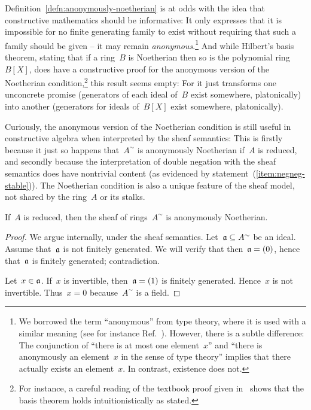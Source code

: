 \documentclass{ws-rv9x6}
\begin{document}
{Definition~\ref{defn:anonymously-noetherian} is at odds with the idea that constructive mathematics should
be informative: It only expresses that it is impossible for no finite
generating family to exist without requiring that such a family should be given
-- it may remain \emph{anonymous}.\footnote{We borrowed the term ``anonymous''
from type theory, where it is used with a similar meaning (see for instance
Ref.~). However, there is a
subtle difference: The conjunction of ``there is at most one element~$x$'' and
``there is anonymously an element~$x$ in the sense of type theory'' implies
that there actually exists an element~$x$. In contrast, \notnot existence does
not.} And while Hilbert's basis theorem, stating that if a ring~$B$ is
Noetherian then so is the polynomial ring~$B[X]$, does have a constructive
proof for the anonymous version of the Noetherian condition,\footnote{For
instance, a careful reading of the textbook proof given
in~\cite[Theorem~7.5]{atiyah-macdonald:commutative-algebra} shows that the
basis theorem holds intuitionistically as stated.} this result seems empty: For
it just transforms one unconcrete promise (generators of each ideal of~$B$
exist somewhere, platonically) into another (generators for ideals of~$B[X]$
exist somewhere, platonically).

Curiously, the anonymous version of the Noetherian condition is still useful in
constructive algebra when interpreted by the sheaf semantics: This is firstly
because it just so happens that~$A^\sim$ is anonymously Noetherian if~$A$ is reduced,
and secondly because the interpretation of double negation with the sheaf
semantics does have nontrivial content (as evidenced by
statement~(\ref{item:negneg-stable})). The Noetherian condition is also a
unique feature of the sheaf model, not shared by the ring~$A$ or its stalks.

\begin{proposition}\label{prop:anon-noeth}
If~$A$ is reduced, then the sheaf of rings~$A^\sim$ is anonymously
Noetherian.\end{proposition}

\begin{proof}We argue internally, under the sheaf semantics. Let~$\mathfrak{a} \subseteq A^\sim$ be an ideal.
Assume that~$\mathfrak{a}$ is not finitely generated. We will verify that then~$\mathfrak{a} =
(0)$, hence that~$\mathfrak{a}$ is finitely generated; contradiction.

Let~$x \in \mathfrak{a}$. If~$x$ is invertible, then~$\mathfrak{a} = (1)$ is finitely
generated. Hence~$x$ is not invertible. Thus~$x = 0$ because~$A^\sim$ is a
field.
\end{proof}

}
\end{document}

